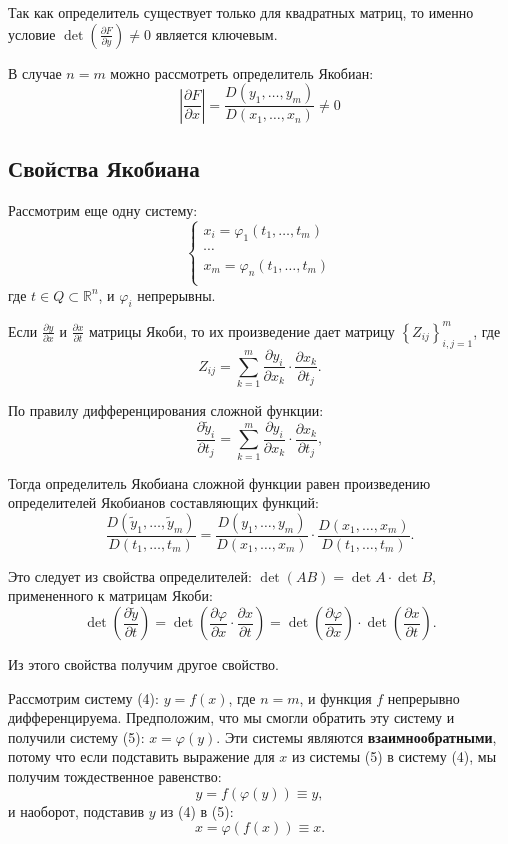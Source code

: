 \documentclass{article}
\begin{document}
Так как определитель существует только для квадратных матриц, то именно условие $\det \left( \frac{\partial F}{\partial y} \right) \neq 0$ является ключевым.

В случае $n = m$ можно рассмотреть определитель Якобиан:
\[
\left| \frac{\partial F}{\partial x} \right| = \frac{D(y_1, \dots, y_m)}{D(x_1, \dots, x_n)} \neq 0
\]

\subsection*{Свойства Якобиана}

Рассмотрим еще одну систему:
\begin{equation}
\begin{cases}
x_i = \varphi_1(t_1, \dots, t_m) \\
\cdots \\
x_m = \varphi_n(t_1, \dots, t_m) \\
\end{cases}
\tag{5}
\end{equation}
где $t \in Q \subset \mathbb{R}^n$, и $\varphi_i$ непрерывны.

Если $\frac{\partial y}{\partial x}$ и $\frac{\partial x}{\partial t}$ матрицы Якоби, то их произведение дает матрицу $\left\{ Z_{ij} \right\}_{i,j=1}^{m}$, где
\[
Z_{ij} = \sum_{k=1}^{m} \frac{\partial y_i}{\partial x_k} \cdot \frac{\partial x_k}{\partial t_j}.
\]

По правилу дифференцирования сложной функции:
\[
\frac{\partial \widetilde{y}_i}{\partial t_j} = \sum_{k=1}^{m} \frac{\partial y_i}{\partial x_k} \cdot \frac{\partial x_k}{\partial t_j},
\]

Тогда определитель Якобиана сложной функции равен произведению определителей Якобианов составляющих функций:
\[
\frac{D(\widetilde{y}_1, \dots, \widetilde{y}_m)}{D(t_1, \dots, t_m)} =
\frac{D(y_1, \dots, y_m)}{D(x_1, \dots, x_m)} \cdot
\frac{D(x_1, \dots, x_m)}{D(t_1, \dots, t_m)}.
\]

Это следует из свойства определителей: $\det(AB) = \det A \cdot \det B$, примененного к матрицам Якоби:
\[
\det \left( \frac{\partial \widetilde{y}}{\partial t} \right) =
\det \left( \frac{\partial \varphi}{\partial x} \cdot \frac{\partial x}{\partial t} \right) =
\det \left( \frac{\partial \varphi}{\partial x} \right) \cdot
\det \left( \frac{\partial x}{\partial t} \right).
\]

Из этого свойства получим другое свойство.

Рассмотрим систему (4): ${y} = {f}(x)$, где $n = m$, и функция ${f}$ непрерывно дифференцируема. Предположим, что мы смогли обратить эту систему и получили систему (5): ${x} = \varphi(y)$. Эти системы являются \textbf{взаимнообратными}, потому что если подставить выражение для ${x}$ из системы (5) в систему (4), мы получим тождественное равенство:
\[
{y} = {f}(\varphi(y)) \equiv y,
\]
и наоборот, подставив ${y}$ из (4) в (5):
\[
{x} = \varphi({f}(x)) \equiv x.
\]
\end{document}
